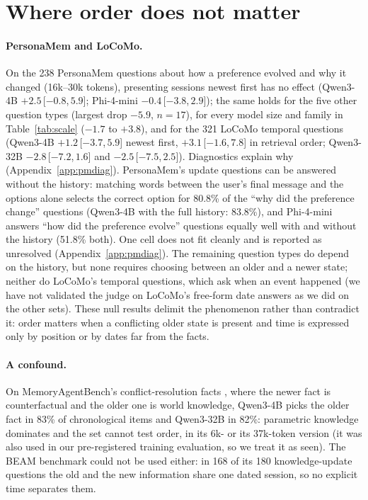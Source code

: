 \documentclass[11pt]{article}
\newcommand{\ci}[2]{\,[$#1$,\,$#2$]}
\begin{document}
\section{Where order does not matter}
\label{sec:boundary}

\paragraph{PersonaMem and LoCoMo.}
On the 238 PersonaMem questions about how a preference evolved and why it changed (16k--30k tokens), presenting sessions newest first has no effect (Qwen3-4B $+2.5$\ci{-0.8}{5.9}; Phi-4-mini $-0.4$\ci{-3.8}{2.9}); the same holds for the five other question types (largest drop $-5.9$, $n=17$), for every model size and family in Table~\ref{tab:scale} ($-1.7$ to $+3.8$), and for the 321 LoCoMo temporal questions (Qwen3-4B $+1.2$\ci{-3.7}{5.9} newest first, $+3.1$\ci{-1.6}{7.8} in retrieval order; Qwen3-32B $-2.8$\ci{-7.2}{1.6} and $-2.5$\ci{-7.5}{2.5}).
Diagnostics explain why (Appendix~\ref{app:pmdiag}).
PersonaMem's update questions can be answered without the history: matching words between the user's final message and the options alone selects the correct option for 80.8\% of the ``why did the preference change'' questions (Qwen3-4B with the full history: 83.8\%), and Phi-4-mini answers ``how did the preference evolve'' questions equally well with and without the history (51.8\% both).
One cell does not fit cleanly and is reported as unresolved (Appendix~\ref{app:pmdiag}).
The remaining question types do depend on the history, but none requires choosing between an older and a newer state; neither do LoCoMo's temporal questions, which ask when an event happened (we have not validated the judge on LoCoMo's free-form date answers as we did on the other sets).
These null results delimit the phenomenon rather than contradict it: order matters when a conflicting older state is present and time is expressed only by position or by dates far from the facts.

\paragraph{A confound.}
On MemoryAgentBench's conflict-resolution facts \citep{hu2025memoryagentbench}, where the newer fact is counterfactual and the older one is world knowledge, Qwen3-4B picks the older fact in 83\% of chronological items and Qwen3-32B in 82\%: parametric knowledge dominates and the set cannot test order, in its 6k- or its 37k-token version (it was also used in our pre-registered training evaluation, so we treat it as seen). The BEAM benchmark \citep{beam2025} could not be used either: in 168 of its 180 knowledge-update questions the old and the new information share one dated session, so no explicit time separates them.
\end{document}
